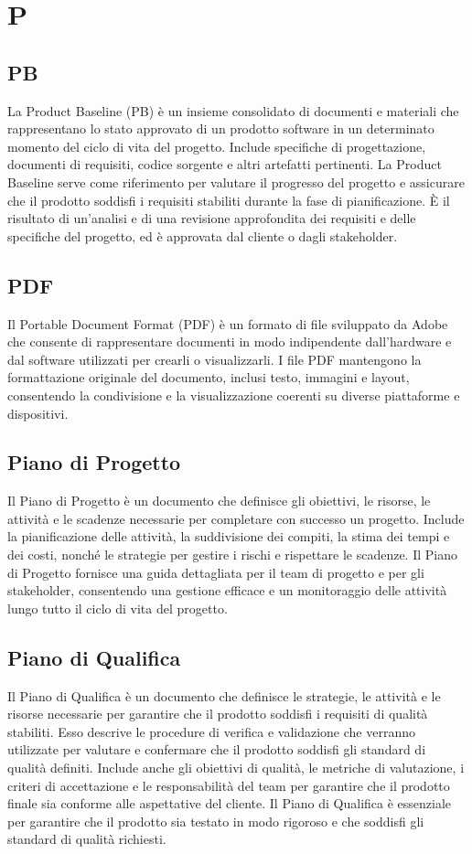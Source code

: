 \section*{P} 
\subsection*{PB} 
La Product Baseline (PB) è un insieme consolidato di documenti e materiali che rappresentano lo stato approvato di un prodotto software in un determinato momento del ciclo di vita del progetto. Include specifiche di progettazione, documenti di requisiti, codice sorgente e altri artefatti pertinenti. La Product Baseline serve come riferimento per valutare il progresso del progetto e assicurare che il prodotto soddisfi i requisiti stabiliti durante la fase di pianificazione. È il risultato di un'analisi e di una revisione approfondita dei requisiti e delle specifiche del progetto, ed è approvata dal cliente o dagli stakeholder.
\subsection*{PDF} 
Il Portable Document Format (PDF) è un formato di file sviluppato da Adobe che consente di rappresentare documenti in modo indipendente dall'hardware e dal software utilizzati per crearli o visualizzarli. I file PDF mantengono la formattazione originale del documento, inclusi testo, immagini e layout, consentendo la condivisione e la visualizzazione coerenti su diverse piattaforme e dispositivi. 
\subsection*{Piano di Progetto} 
Il Piano di Progetto è un documento che definisce gli obiettivi, le risorse, le attività e le scadenze necessarie per completare con successo un progetto. Include la pianificazione delle attività, la suddivisione dei compiti, la stima dei tempi e dei costi, nonché le strategie per gestire i rischi e rispettare le scadenze. Il Piano di Progetto fornisce una guida dettagliata per il team di progetto e per gli stakeholder, consentendo una gestione efficace e un monitoraggio delle attività lungo tutto il ciclo di vita del progetto. 
\subsection*{Piano di Qualifica} 
Il Piano di Qualifica è un documento che definisce le strategie, le attività e le risorse necessarie per garantire che il prodotto soddisfi i requisiti di qualità stabiliti. Esso descrive le procedure di verifica e validazione che verranno utilizzate per valutare e confermare che il prodotto soddisfi gli standard di qualità definiti. Include anche gli obiettivi di qualità, le metriche di valutazione, i criteri di accettazione e le responsabilità del team per garantire che il prodotto finale sia conforme alle aspettative del cliente. Il Piano di Qualifica è essenziale per garantire che il prodotto sia testato in modo rigoroso e che soddisfi gli standard di qualità richiesti. 
